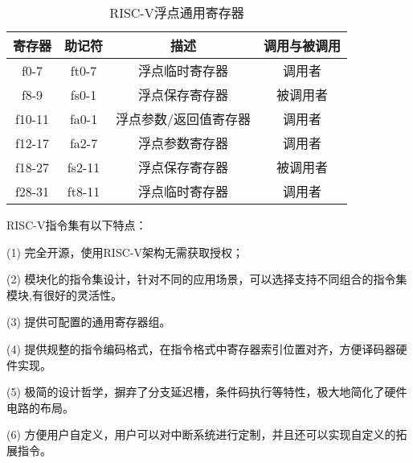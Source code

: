 \begin{table}[h]
  \centering
  \caption{RISC-V浮点通用寄存器}
  \label{tab:fpr}
  \begin{tabular}{cccc}
    \toprule
寄存器 &	助记符	& 描述 &	调用与被调用\\
    \midrule
    f0-7 & ft0-7 & 浮点临时寄存器 & 调用者\\
    f8-9 & fs0-1 & 浮点保存寄存器 & 被调用者\\
    f10-11 & fa0-1 & 浮点参数/返回值寄存器 & 调用者\\
    f12-17 & fa2-7 & 浮点参数寄存器 & 调用者\\
    f18-27 & fs2-11 & 浮点保存寄存器 & 被调用者\\
    f28-31 & ft8-11 & 浮点临时寄存器 & 调用者\\
    \bottomrule
  \end{tabular}
\end{table}


RISC-V指令集有以下特点：


(1) 完全开源，使用RISC-V架构无需获取授权；


(2) 模块化的指令集设计，针对不同的应用场景，可以选择支持不同组合的指令集模块,有很好的灵活性。


(3) 提供可配置的通用寄存器组。


(4) 提供规整的指令编码格式，在指令格式中寄存器索引位置对齐，方便译码器硬件实现。


(5) 极简的设计哲学，摒弃了分支延迟槽，条件码执行等特性，极大地简化了硬件电路的布局。


(6) 方便用户自定义，用户可以对中断系统进行定制，并且还可以实现自定义的拓展指令。
















